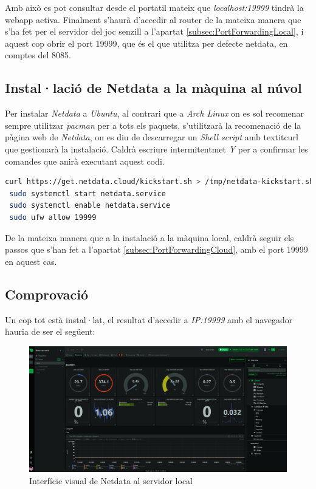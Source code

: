 Amb això es pot consultar desde el  portatil mateix que \textit{localhost:19999} tindrà la webapp activa. Finalment s'haurà d'accedir al router de la mateixa manera que s'ha fet per el servidor del joc senzill a l'apartat \ref{subsec:PortForwardingLocal}, i aquest cop obrir el port 19999, que és el que utilitza per defecte netdata, en comptes del 8085.

\subsection{Instal·lació de Netdata a la màquina al núvol}

Per instalar \textit{Netdata} a \textit{Ubuntu}, al contrari que a \textit{Arch Linux} on es sol recomenar sempre utilitzar \textit{pacman} per a tots els paquets, s'utilitzarà la recomenació de la pàgina web de \textit{Netdata}, on es diu de descarregar un \textit{Shell script} amb textit{curl} que gestionarà la instalació. Caldrà escriure intermitentmet \textit{Y} per a confirmar les comandes que anirà executant aquest codi.\cite{noauthor_install_2024}


\begin{lstlisting}[language=bash, caption=Instal·lació de netdata al núvul]
 curl https://get.netdata.cloud/kickstart.sh > /tmp/netdata-kickstart.sh && sh /tmp/netdata-kickstart.sh
 sudo systemctl start netdata.service
 sudo systemctl enable netdata.service
 sudo ufw allow 19999
\end{lstlisting}

De la mateixa manera que a la instalació a la màquina local, caldrà seguir els passos que s'han fet a l'apartat \ref{subsec:PortForwardingCloud}, amb el port 19999 en aquest cas.

\subsection{Comprovació}

Un cop tot està instal·lat, el resultat d'accedir a \textit{IP:19999} amb el navegador hauria de ser el següent:

\begin{figure}[!htbp] \includegraphics[width=1\textwidth]{Imatges/c-netdata.png}
\caption{Interfície visual de Netdata al servidor local} \end{figure}

